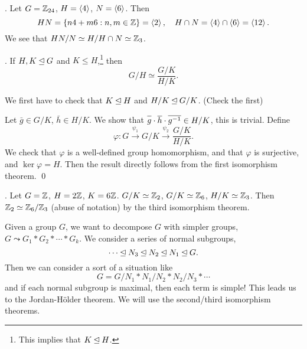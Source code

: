 \ex. Let \(G = \mathbb{Z}_{24}\), \(H = \left\langle 4 \right\rangle\), \(N = \left\langle 6 \right\rangle\). Then
\[
    HN = \{n4 + m6 : n, m \in \mathbb{Z}\} = \left\langle 2 \right\rangle, \quad H\cap N = \left\langle 4 \right\rangle\cap \left\langle 6 \right\rangle = \left\langle 12 \right\rangle.
\]
We see that \(HN / N \simeq H / H\cap N \simeq \mathbb{Z}_3\).

\medskip

\thm.  If \(H, K \unlhd G\) and \(K \leq H\),\footnote{This implies that \(K \unlhd H\).} then
\[
    G / H \simeq \frac{G/K}{H/K}.
\]

\pf We first have to check that \(K \unlhd H\) and \(H/K \unlhd G/K\). (Check the first)

Let \(\bar{g} \in G/K\), \(\bar{h} \in H/K\). We show that \(\bar{g} \cdot \bar{h} \cdot \bar{g\inv} \in H/K\), this is trivial. Define
\[
    \varphi : G \overset{\psi_1}{\longrightarrow} G/K \overset{\psi_2}{\longrightarrow} \frac{G/K}{H/K}.
\]
We check that \(\varphi\) is a well-defined group homomorphism, and that \(\varphi\) is surjective, and \(\ker \varphi = H\). Then the result directly follows from the first isomorphism theorem. \qed

\ex. Let \(G = \mathbb{Z}\), \(H = 2\mathbb{Z}\), \(K = 6\mathbb{Z}\). \(G/K \simeq \mathbb{Z}_2\), \(G/K \simeq \mathbb{Z}_6\), \(H/K \simeq \mathbb{Z}_3\). Then \(\mathbb{Z}_2 \simeq \mathbb{Z}_6 / \mathbb{Z}_3\) (abuse of notation) by the third isomorphism theorem.


Given a group \(G\), we want to decompose \(G\) with simpler groups, \(G \leadsto G_1 * G_2 * \cdots * G_k\). We consider a series of normal subgroups,
\[
    \cdots \unlhd N_3 \unlhd N_2 \unlhd N_1 \unlhd G.
\]
Then we can consider a sort of a situation like
\[
    G = G/N_1 * N_1 / N_2 * N_2 / N_3 * \cdots
\]
and if each normal subgroup is maximal, then each term is simple! This leads us to the Jordan-Hölder theorem. We will use the second/third isomorphism theorems.


\pagebreak
